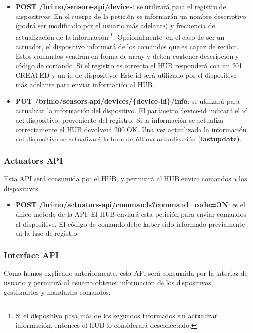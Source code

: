 \begin{itemize}
\item \textbf{POST /brimo/sensors-api/devices}: se utilizará para el registro de dispositivos. En el cuerpo de la petición se informarán
 un nombre descriptivo (podrá ser modificado por el usuario más adelante) y frecuencia
de actualización de la información \footnote{ Si el dispositivo pasa más de los segundos informados sin actualizar información, entonces
el HUB lo considerará desconectado.}. Opcionalmente, en el caso de ser un actuador, el dispositivo informará de los comandos que es capaz
de recibir. Estos comandos vendrán en forma de array y deben contener descripción y código de comando.
Si el registro es correcto el HUB responderá con un 201 CREATED y un id de dispositivo. Este id será utilizado por el dispositivo más adelante
para enviar información al HUB.
\item \textbf{PUT /brimo/sensors-api/devices/\{device-id\}/info}: se utilizará para actualizar la información del dispositivo. El parámetro
device-id indicará el id del dispositivo, proveniente del registro. Si la información se actualiza correctamente el HUB devolverá 200 OK. Una vez
actualizada la información del dispositivo se actualizará la hora de última actualización \textbf{(lastupdate)}.
\end{itemize}

\subsubsection{Actuators API}
Esta API será consumida por el HUB, y permitirá al HUB enviar comandos a los dispositivos.

\begin{itemize}

\item \textbf{POST /brimo/actuators-api/commands?command\_code=ON}: es el único método de la API. El HUB enviará esta petición para enviar
comandos al dispositivo. El código de comando debe haber sido informado previamente en la fase de registro.

\end{itemize}

\subsubsection{Interface API}
Como hemos explicado anteriormente, esta API será consumida por la interfaz de usuario y permitirá al usuario obtener información de los dispositivos,
gestionarlos y mandarles comandos:

